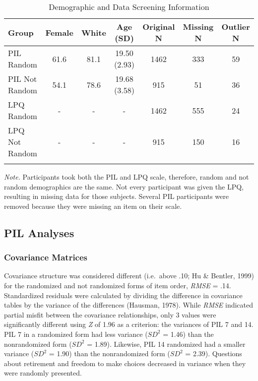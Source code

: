 \documentclass[english,man, mask]{apa6}
\theoremstyle{definition}
\theoremstyle{definition}
\theoremstyle{definition}
\theoremstyle{remark}
\begin{document}
\begin{table}[tbp]
\begin{center}
\begin{threeparttable}
\caption{\label{tab:demo-table}Demographic and Data Screening Information}
\begin{tabular}{lcccccc}
\toprule
Group & \multicolumn{1}{c}{Female} & \multicolumn{1}{c}{White} & \multicolumn{1}{c}{Age (SD)} & \multicolumn{1}{c}{Original N} & \multicolumn{1}{c}{Missing N} & \multicolumn{1}{c}{Outlier N}\\
\midrule
PIL Random & 61.6 & 81.1 & 19.50 (2.93) & 1462 & 333 & 59\\
PIL Not Random & 54.1 & 78.6 & 19.68 (3.58) & 915 & 51 & 36\\
LPQ Random & - & - & - & 1462 & 555 & 24\\
LPQ Not Random & - & - & - & 915 & 150 & 16\\
\bottomrule
\addlinespace
\end{tabular}
\begin{tablenotes}[para]
\textit{Note.} Participants took both the PIL and LPQ scale, therefore, random and not random demographics are the same. Not every participant was given the LPQ, resulting in missing data for those subjects. Several PIL participants were removed because they were missing an item on their scale.
\end{tablenotes}
\end{threeparttable}
\end{center}
\end{table}

\subsection{PIL Analyses}\label{pil-analyses}

\subsubsection{Covariance Matrices}\label{covariance-matrices}

Covariance structure was considered different (i.e.~above .10; Hu \&
Bentler, 1999) for the randomized and not randomized forms of item
order, \emph{RMSE} = .14. Standardized residuals were calculated by
dividing the difference in covariance tables by the variance of the
differences (Hausman, 1978). While \emph{RMSE} indicated partial misfit
between the covariance relationships, only 3 values were significantly
different using \emph{Z} of 1.96 as a criterion: the variances of PIL 7
and 14. PIL 7 in a randomized form had less variance (\(SD^2\) = 1.46)
than the nonrandomized form (\(SD^2\) = 1.89). Likewise, PIL 14
randomized had a smaller variance (\(SD^2\) = 1.90) than the
nonrandomized form (\(SD^2\) = 2.39). Questions about retirement and
freedom to make choices decreased in variance when they were randomly
presented.
\end{document}
